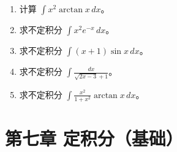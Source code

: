 \documentclass[12pt, a4paper]{article}
\begin{document}
\begin{enumerate}
    \item 计算 $ \int x^{2} \arctan x \, dx $。

    \item 求不定积分 $ \int x^{2}e^{-x} \, dx $。

    \item 求不定积分 $ \int(x+1)\sin x \, dx $。

    \item 求不定积分 $ \int\frac{dx}{\sqrt{2x-3}+1} $。

    \item 求不定积分 $ \int\frac{x^{2}}{1+x^{2}}\arctan x \, dx $。
\end{enumerate}

\section*{第七章 定积分（基础）}
\end{document}
